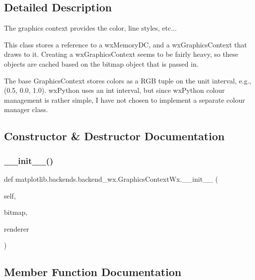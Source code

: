 \subsection{Detailed Description}
\begin{DoxyVerb}The graphics context provides the color, line styles, etc...

This class stores a reference to a wxMemoryDC, and a
wxGraphicsContext that draws to it.  Creating a wxGraphicsContext
seems to be fairly heavy, so these objects are cached based on the
bitmap object that is passed in.

The base GraphicsContext stores colors as a RGB tuple on the unit
interval, e.g., (0.5, 0.0, 1.0).  wxPython uses an int interval, but
since wxPython colour management is rather simple, I have not chosen
to implement a separate colour manager class.
\end{DoxyVerb}
 

\subsection{Constructor \& Destructor Documentation}
\mbox{\label{classmatplotlib_1_1backends_1_1backend__wx_1_1GraphicsContextWx_a7b4313654f83ca9ac33eba0c54287033}} 
\subsubsection{\texorpdfstring{\+\_\+\+\_\+init\+\_\+\+\_\+()}{\_\_init\_\_()}}
{\footnotesize\ttfamily def matplotlib.\+backends.\+backend\+\_\+wx.\+Graphics\+Context\+Wx.\+\_\+\+\_\+init\+\_\+\+\_\+ (\begin{DoxyParamCaption}\item[{}]{self,  }\item[{}]{bitmap,  }\item[{}]{renderer }\end{DoxyParamCaption})}



\subsection{Member Function Documentation}
\mbox{\label{classmatplotlib_1_1backends_1_1backend__wx_1_1GraphicsContextWx_af01aed5b5c979ca88dac8e468044f9ab}} 
